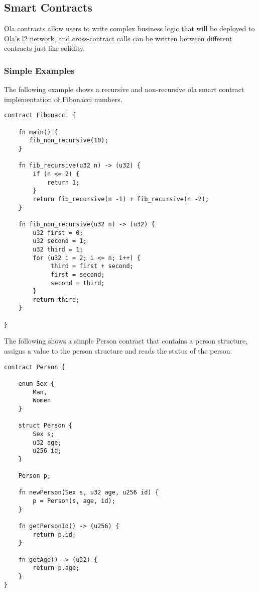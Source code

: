 \subsection{Smart Contracts}


Ola contracts allow users to write complex business logic that will be deployed to Ola's l2 network, and cross-contract calls can be written between different contracts just like solidity.

\subsubsection{Simple Examples}

The following example shows a recursive and non-recursive ola smart contract implementation of Fibonacci numbers.

\begin{lstlisting}
contract Fibonacci {

    fn main() {
       fib_non_recursive(10);
    }

    fn fib_recursive(u32 n) -> (u32) {
        if (n <= 2) {
            return 1;
        }
        return fib_recursive(n -1) + fib_recursive(n -2);
    }

    fn fib_non_recursive(u32 n) -> (u32) {
        u32 first = 0;
        u32 second = 1;
        u32 third = 1;
        for (u32 i = 2; i <= n; i++) {
             third = first + second;
             first = second;
             second = third;
        }
        return third;
    }

}
\end{lstlisting}

The following shows a simple Person contract that contains a person structure, assigns a value to the person structure and reads the status of the person.

\begin{lstlisting}
contract Person {

    enum Sex {
        Man,
        Women
    }

    struct Person {
        Sex s;
        u32 age;
        u256 id;
    }

    Person p;

    fn newPerson(Sex s, u32 age, u256 id) {
        p = Person(s, age, id);
    }

    fn getPersonId() -> (u256) {
        return p.id;
    }

    fn getAge() -> (u32) {
        return p.age;
    }
}
\end{lstlisting}

